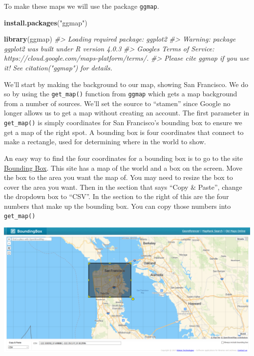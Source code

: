 \documentclass[
  12pt,
]{book}
\newenvironment{Shaded}{\begin{snugshade}}{\end{snugshade}}
\newcommand{\CommentTok}[1]{\textcolor[rgb]{0.37,0.37,0.37}{\textit{#1}}}
\newcommand{\KeywordTok}[1]{\textcolor[rgb]{0.27,0.27,0.27}{\textbf{#1}}}
\newcommand{\NormalTok}[1]{#1}
\newcommand{\StringTok}[1]{\textcolor[rgb]{0.5,0.5,0.5}{#1}}
\begin{document}
To make these maps we will use the package \texttt{ggmap}.

\begin{Shaded}
\begin{Highlighting}[]
\KeywordTok{install.packages}\NormalTok{(}\StringTok{"ggmap"}\NormalTok{)}
\end{Highlighting}
\end{Shaded}

\begin{Shaded}
\begin{Highlighting}[]
\KeywordTok{library}\NormalTok{(ggmap)}
\CommentTok{\#\textgreater{} Loading required package: ggplot2}
\CommentTok{\#\textgreater{} Warning: package \textquotesingle{}ggplot2\textquotesingle{} was built under R version 4.0.3}
\CommentTok{\#\textgreater{} Google\textquotesingle{}s Terms of Service: https://cloud.google.com/maps{-}platform/terms/.}
\CommentTok{\#\textgreater{} Please cite ggmap if you use it! See citation("ggmap") for details.}
\end{Highlighting}
\end{Shaded}

We'll start by making the background to our map, showing San Francisco. We do so by using the \texttt{get\_map()} function from \texttt{ggmap} which gets a map background from a number of sources. We'll set the source to ``stamen'' since Google no longer allows us to get a map without creating an account. The first parameter in \texttt{get\_map()} is simply coordinates for San Francisco's bounding box to ensure we get a map of the right spot. A bounding box is four coordinates that connect to make a rectangle, used for determining where in the world to show.

An easy way to find the four coordinates for a bounding box is to go to the site \href{https://boundingbox.klokantech.com/}{Bounding Box}. This site has a map of the world and a box on the screen. Move the box to the area you want the map of. You may need to resize the box to cover the area you want. Then in the section that says ``Copy \& Paste'', change the dropdown box to ``CSV''. In the section to the right of this are the four numbers that make up the bounding box. You can copy those numbers into \texttt{get\_map()}

\includegraphics{images/bounding_box.PNG}
\end{document}
